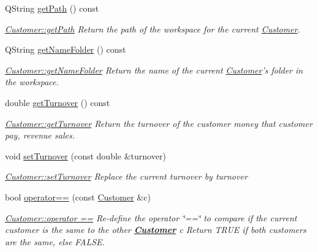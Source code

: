 \begin{DoxyCompactItemize}
Q\-String \hyperlink{classModels_1_1Customer_ac1aec0fb9058333e1a2496b1c29049af}{get\-Path} () const 
\begin{DoxyCompactList}\small\item\em \hyperlink{classModels_1_1Customer_ac1aec0fb9058333e1a2496b1c29049af}{Customer\-::get\-Path} Return the path of the workspace for the current \hyperlink{classModels_1_1Customer}{Customer}. \end{DoxyCompactList}\item 
Q\-String \hyperlink{classModels_1_1Customer_ab7c63946125a6b8d876f0f4e2b50c97e}{get\-Name\-Folder} () const 
\begin{DoxyCompactList}\small\item\em \hyperlink{classModels_1_1Customer_ab7c63946125a6b8d876f0f4e2b50c97e}{Customer\-::get\-Name\-Folder} Return the name of the current \hyperlink{classModels_1_1Customer}{Customer}'s folder in the workspace. \end{DoxyCompactList}\item 
double \hyperlink{classModels_1_1Customer_a193fb1920b53048d8a5f7c8e08581e69}{get\-Turnover} () const 
\begin{DoxyCompactList}\small\item\em \hyperlink{classModels_1_1Customer_a193fb1920b53048d8a5f7c8e08581e69}{Customer\-::get\-Turnover} Return the turnover of the customer money that customer pay, revenue sales. \end{DoxyCompactList}\item 
void \hyperlink{classModels_1_1Customer_aee29f27497db5cd37bc835e202c24eac}{set\-Turnover} (const double \&turnover)
\begin{DoxyCompactList}\small\item\em \hyperlink{classModels_1_1Customer_aee29f27497db5cd37bc835e202c24eac}{Customer\-::set\-Turnover} Replace the current turnover by {\itshape turnover} \end{DoxyCompactList}\item 
bool \hyperlink{classModels_1_1Customer_ab379700fa93f5b9eb0f8546b03aff70f}{operator==} (const \hyperlink{classModels_1_1Customer}{Customer} \&c)
\begin{DoxyCompactList}\small\item\em \hyperlink{classModels_1_1Customer_ab379700fa93f5b9eb0f8546b03aff70f}{Customer\-::operator ==} Re-\/define the operator \char`\"{}==\char`\"{} to compare if the current customer is the same to the other {\bfseries \hyperlink{classModels_1_1Customer}{Customer}} {\itshape c} Return T\-R\-U\-E if both customers are the same, else F\-A\-L\-S\-E. \end{DoxyCompactList}\item 

\end{DoxyCompactItemize}
